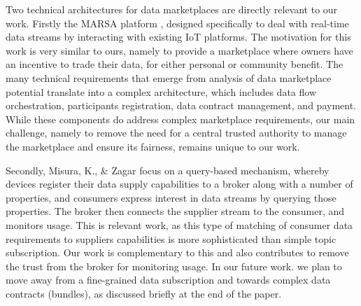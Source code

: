 \documentclass[chi_draft]{sigchi}
\begin{document}

Two technical architectures for data marketplaces are directly relevant to our work.
Firstly the MARSA platform \cite{Cao:2016:MMR:2926746.2883611}, designed specifically to deal with real-time data streams by interacting with existing IoT platforms.
The motivation for this work is very similar to ours, namely to provide a marketplace where owners have an incentive to trade their data, for either personal or community benefit.
The many technical requirements that emerge from analysis of data marketplace potential translate into a complex architecture, which includes data flow orchestration, participants registration, data contract management, and payment.  
While these components do address complex marketplace requirements, our main challenge, namely to remove the need for a central trusted authority to manage the marketplace and ensure its fairness, remains unique to our work.

Secondly, Misura, K., \& Zagar \cite{7765669} focus on a query-based mechanism, whereby devices register their data supply capabilities to a broker along with a number of properties, and consumers express interest in data streams by querying those properties. The broker then connects the supplier stream to the consumer, and monitors usage. 
This is relevant work, as this type of matching of consumer data requirements to suppliers capabilities is more sophisticated than simple topic subscription. Our work is complementary to this  and also contributes to remove the trust from the broker for monitoring usage.
In our future work. we plan to move away from a fine-grained data subscription and towards complex data contracts (bundles), as discussed briefly at the end of the paper.
\end{document}
